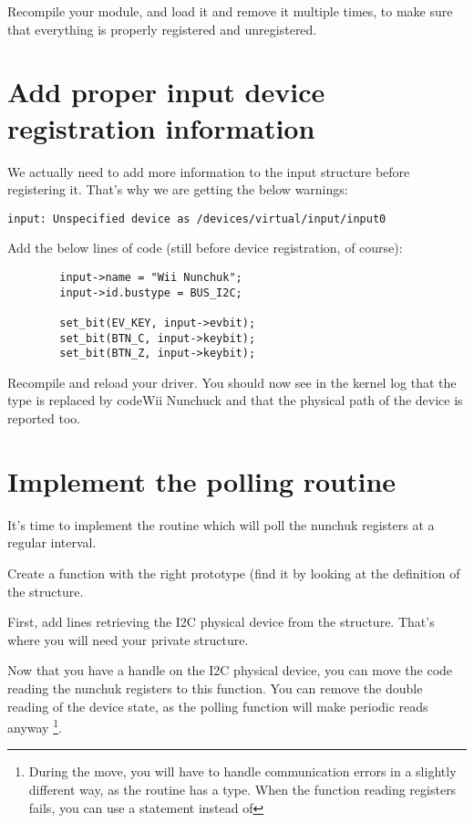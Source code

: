 Recompile your module, and load it and remove it multiple times, to
make sure that everything is properly registered and unregistered.

\section{Add proper input device registration information}

We actually need to add more information to the input structure before
registering it. That's why we are getting the below warnings:

\begin{verbatim}
input: Unspecified device as /devices/virtual/input/input0
\end{verbatim}

Add the below lines of code (still before device registration, of
course):

\begin{verbatim}
        input->name = "Wii Nunchuk";
        input->id.bustype = BUS_I2C;

        set_bit(EV_KEY, input->evbit);
        set_bit(BTN_C, input->keybit);
        set_bit(BTN_Z, input->keybit);
\end{verbatim}

Recompile and reload your driver. You should now see in the kernel log
that the  type is replaced by 
code{Wii Nunchuck} and that the physical path of the device is reported
too. 

\section{Implement the polling routine}

It's time to implement the routine which will poll the nunchuk registers
at a regular interval. 

Create a  function with the right prototype (find
it by looking at the definition of the  structure.

First, add lines retrieving the I2C physical device from the
 structure. That's where you will need your
private  structure.

Now that you have a handle on the I2C physical device, you can move the
code reading the nunchuk registers to this function. You can
remove the double reading of the device state, as the polling function
will make periodic reads anyway \footnote{During the move, you will have
to handle communication errors in a slightly different way, as the
 routine has a  type. When the function 
reading registers fails, you can use a  statement instead
of }.

